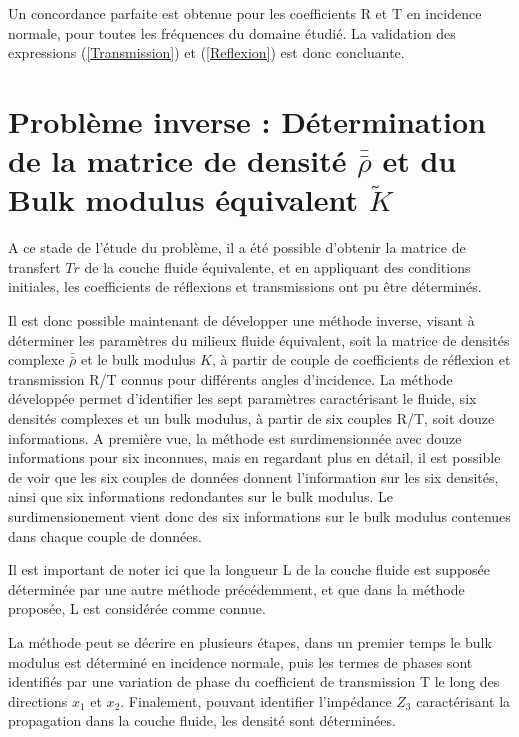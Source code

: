 \documentclass[12pt]{report}
\begin{document}
    Un concordance parfaite est obtenue pour les coefficients R et T en incidence normale, pour toutes les fréquences du domaine étudié. La validation des expressions (\ref{Transmission}) et (\ref{Reflexion}) est donc concluante. 

\chapter{Problème inverse : Détermination de la matrice de densité $\bar{\bar{\rho}}$ et du Bulk modulus équivalent $\tilde{K}$}
\label{Ch_Inv}
	A ce stade de l'étude du problème, il a été possible d'obtenir la matrice de transfert $Tr$ de la couche fluide équivalente, et en appliquant des conditions initiales, les coefficients de réflexions et transmissions ont pu être déterminés.
	
	Il est donc possible maintenant de développer une méthode inverse, visant à déterminer les paramètres du milieux fluide équivalent, soit la matrice de densités complexe $\bar{\bar{\rho}}$ et le bulk modulus $K$, à partir de couple de coefficients de réflexion et transmission R/T connus pour différents angles d'incidence.
	La méthode développée permet d'identifier les sept paramètres caractérisant le fluide, six densités complexes et un bulk modulus, à partir de six couples R/T, soit douze informations. A première vue, la méthode est surdimensionnée avec douze informations pour six inconnues, mais en regardant plus en détail, il est possible de voir que les six couples de données donnent l'information sur les six densités, ainsi que six informations redondantes sur le bulk modulus. Le surdimensionement vient donc des six informations sur le bulk modulus contenues dans chaque couple de données. 
    
    Il est important de noter ici que la longueur L de la couche fluide est supposée déterminée par une autre méthode précédemment, et que dans la méthode proposée, L est considérée comme connue.
    
    La méthode peut se décrire en plusieurs étapes, dans un premier temps le bulk modulus est déterminé en incidence normale, puis les termes de phases sont identifiés par une variation de phase du coefficient de transmission T le long des directions $x_1$ et $x_2$. Finalement, pouvant identifier l'impédance $Z_3$ caractérisant la propagation dans la couche fluide, les densité sont déterminées.
    
\end{document}
